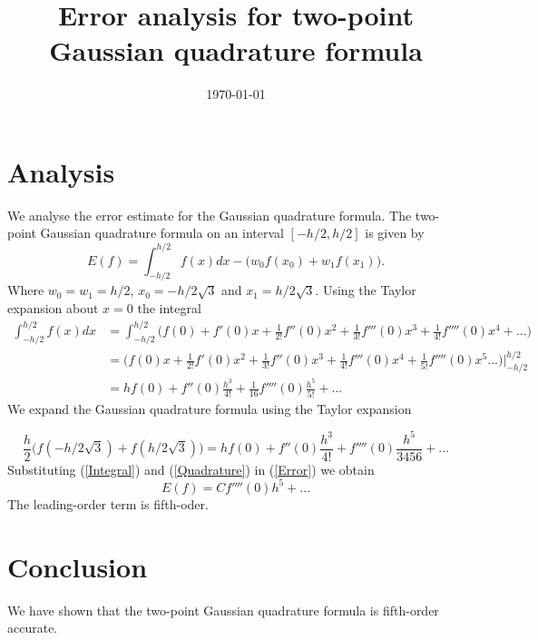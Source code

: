 \documentclass[a4paper]{article}
\title{Error analysis for two-point Gaussian quadrature formula}
\author{}
\date{\today}
\begin{document}
\maketitle
\section*{Analysis}
We analyse the error estimate for the Gaussian quadrature formula. The two-point Gaussian quadrature formula on an interval $[-h/2, h/2]$ is given by
\begin{equation}\label{Error}
    E(f) = \int_{-h/2}^{h/2}f(x)dx - \Big(w_0f(x_0) + w_1f(x_1) \Big).
\end{equation}
Where $w_0 = w_1 = {h}/{2}$, $x_0 = {-h}/{2\sqrt{3}}$ and $x_1 = {h}/{2\sqrt{3}}$.
Using the Taylor expansion about $x = 0$ the integral
\begin{equation}\label{Integral}
    \begin{split}
        \int_{-h/2}^{h/2}f(x)dx &= \int_{-h/2}^{h/2} \Big( f(0) + f'(0)x + \frac{1}{2!}f''(0)x^2 + \frac{1}{3!}f'''(0)x^3 + \frac{1}{4!}f''''(0)x^4 + ... \Big)\\
                            &= \Big( f(0)x + \frac{1}{2!}f'(0)x^2 + \frac{1}{3!}f''(0)x^3 + \frac{1}{4!}f'''(0)x^4 + \frac{1}{5!}f''''(0)x^5 ... \Big)\Big|^{h/2}_{-h/2}\\
                            &= hf(0) + f''(0)\frac{h^3}{4!} + \frac{1}{16}f''''(0)\frac{h^5}{5!} + ...
    \end{split}
\end{equation}
We expand the Gaussian quadrature formula using the Taylor expansion

\begin{equation}\label{Quadrature}
    \frac{h}{2}\Big(f(-h/{2\sqrt{3}}) + f(h/{2\sqrt{3}}) \Big) = hf(0) + f''(0)\frac{h^3}{4!} + f''''(0)\frac{h^5}{3456} + ...
\end{equation}
Substituting (\ref{Integral}) and (\ref{Quadrature}) in (\ref{Error}) we obtain
\begin{equation}
    E(f) = Cf''''(0)h^5 + ...
\end{equation}
The leading-order term is fifth-oder.
\section*{Conclusion}
We have shown that the two-point Gaussian quadrature formula is fifth-order accurate.
\printbibliography
\end{document}
